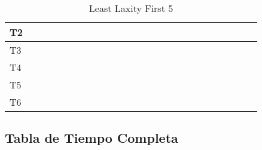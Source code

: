 \documentclass[xcolor=table]{beamer}
\begin{document}
\begin{frame}
\begin{table}
{\begin{tabular}{|l|l|l|l|l|l|l|l|l|l|l|l|l|l|l|l|l|l|l|l|l|l|l|l|l|}
T2 & & \cellcolor{purple} & & \cellcolor{purple} & & \cellcolor{purple} & & \cellcolor{purple} & & \cellcolor{purple} & & \cellcolor{purple} & & \cellcolor{purple} & & \cellcolor{purple} & & \cellcolor{purple} & & \cellcolor{purple} & & \cellcolor{purple} & & \cellcolor{purple} \\ \hline 
T3 & \cellcolor{cyan} & & \cellcolor{cyan} & & \cellcolor{cyan} & & \cellcolor{cyan} & & \cellcolor{cyan} & & \cellcolor{cyan} & & \cellcolor{cyan} & & \cellcolor{cyan} & & \cellcolor{cyan} & & \cellcolor{cyan} & & \cellcolor{cyan} & & \cellcolor{cyan} & \\ \hline 
T4 & & & & & & & & & & & & & & & & & & & & & & & & \\ \hline 
T5 & & & & & & & & & & & & & & & & & & & & & & & & \\ \hline 
T6 & & & & & & & & & & & & & & & & & & & & & & & & \\ \hline 
\end{tabular} 
} 
\caption{ Least Laxity First 5 } 
\end{table} 
\end{frame} 

\subsection{Tabla de Tiempo Completa} 
\end{document}
